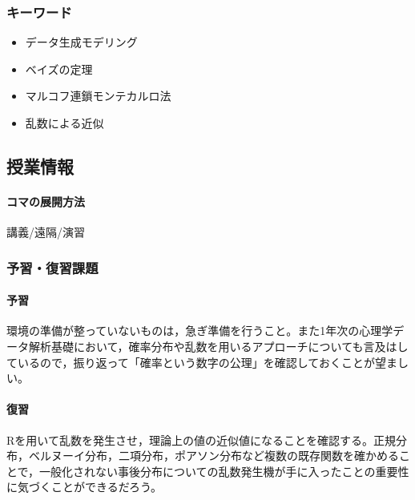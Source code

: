 \subsubsection{キーワード}
\begin{itemize}
    \item データ生成モデリング
    \item ベイズの定理
    \item マルコフ連鎖モンテカルロ法
    \item 乱数による近似
\end{itemize}
\subsection{授業情報}
\paragraph{コマの展開方法}
講義/遠隔/演習
\subsubsection{予習・復習課題}
\paragraph{予習}環境の準備が整っていないものは，急ぎ準備を行うこと。また1年次の心理学データ解析基礎において，確率分布や乱数を用いるアプローチについても言及はしているので，振り返って「確率という数字の公理」を確認しておくことが望ましい。
\paragraph{復習}Rを用いて乱数を発生させ，理論上の値の近似値になることを確認する。正規分布，ベルヌーイ分布，二項分布，ポアソン分布など複数の既存関数を確かめることで，一般化されない事後分布についての乱数発生機が手に入ったことの重要性に気づくことができるだろう。